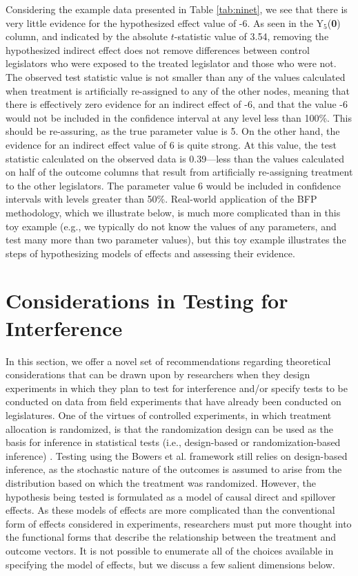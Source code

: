 \documentclass[12pt]{article}
\begin{document}
Considering the example data presented in Table \ref{tab:ninet}, we see that there is very little evidence for the hypothesized effect value of -6. As seen in the Y$_5$({\bf 0}) column, and indicated by the absolute $t$-statistic value of 3.54, removing the hypothesized indirect effect does not remove differences between control legislators who were exposed to the treated legislator and those who were not. The observed test statistic value is not smaller than any of the values calculated when treatment is artificially re-assigned to any of the other nodes, meaning that there is effectively zero evidence for an indirect effect of -6, and that the value -6 would not be included in the confidence interval at any level less than 100\%. This should be re-assuring, as the true parameter value is 5. On the other hand, the evidence for an indirect effect value of 6 is quite strong. At this value, the test statistic calculated on the observed data is 0.39---less than the values calculated on half of the outcome columns that result from artificially re-assigning treatment to the other legislators. The parameter value 6 would be included in confidence intervals with levels greater than 50\%. Real-world application of the BFP methodology, which we illustrate below, is much more complicated than in this toy example (e.g., we typically do not know the values of any parameters, and test many more than two parameter values), but this toy example illustrates the steps of hypothesizing models of effects and assessing their evidence. 



\section{Considerations in Testing for Interference}

In this section, we offer a novel set of recommendations regarding theoretical considerations that can be drawn upon by researchers when they design experiments in which they plan to test for interference and/or specify tests to be conducted on data from field experiments that have already been conducted on legislatures. One of the virtues of controlled experiments, in which treatment allocation is randomized, is that the randomization design can be used as the basis for inference in statistical tests (i.e., design-based or randomization-based inference) \citep{little2000causal}. Testing using the Bowers et al. framework still relies on design-based inference, as the stochastic nature of the outcomes is assumed to arise from the distribution based on which the treatment was randomized. However, the hypothesis being tested is formulated as a model of causal direct and spillover effects. As these models of effects are more complicated than the conventional form of effects considered in experiments, researchers must put more thought into the functional forms that describe the relationship between the treatment and outcome vectors. It is not possible to enumerate all of the choices available in specifying the model of effects, but we discuss a few salient dimensions below. 
\end{document}
